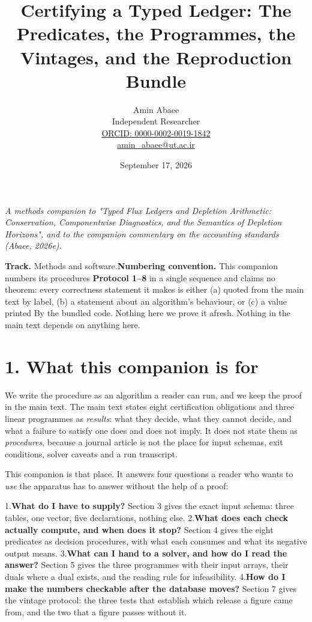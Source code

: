 \documentclass[11pt]{article}
\begin{document}
\title{Certifying a Typed Ledger: The Predicates, the Programmes, the Vintages, and the Reproduction Bundle}
\author{Amin Abaee\\[0.35em]
{\small Independent Researcher}\\[0.55em]
{\small\href{https://orcid.org/\allowbreak{}0000-0002-0019-1842}{ORCID: 0000-0002-0019-1842}}\\[0.3em]
{\small\href{mailto:amin\_abaee@ut.ac.ir}{amin\_abaee@ut.ac.ir}}}
\date{September 17, 2026}
\maketitle

\emph{A methods companion to "Typed Flux Ledgers and Depletion Arithmetic: Conservation, Componentwise Diagnostics, and the Semantics of Depletion Horizons", and to the companion commentary on the accounting standards (Abaee, 2026e).}

\textbf{Track.} Methods and software.\textbf{Numbering convention.} This companion numbers its procedures \textbf{Protocol 1--8} in a single sequence and claims no theorem: every correctness statement it makes is either (a) quoted from the main text by label, (b) a statement about an algorithm's behaviour, or (c) a value printed By the bundled code. Nothing here we prove it afresh. Nothing in the main text depends on anything here.

\vspace{0.8em}

\section*{1. What this companion is for}\label{1-what-this-companion-is-for}

We write the procedure as an algorithm a reader can run, and we keep the proof in the main text. The main text states eight certification obligations and three linear programmes as \emph{results}: what they decide, what they cannot decide, and what a failure to satisfy one does and does not imply. It does not state them as \emph{procedures}, because a journal article is not the place for input schemas, exit conditions, solver caveats and a run transcript.

This companion is that place. It answers four questions a reader who wants to \emph{use} the apparatus has to answer without the help of a proof:

1.\textbf{What do I have to supply?} Section 3 gives the exact input schema: three tables, one vector, five declarations, nothing else. 2.\textbf{What does each check actually compute, and when does it stop?} Section 4 gives the eight predicates as decision procedures, with what each consumes and what its negative output means. 3.\textbf{What can I hand to a solver, and how do I read the answer?} Section 5 gives the three programmes with their input arrays, their duals where a dual exists, and the reading rule for infeasibility. 4.\textbf{How do I make the numbers checkable after the database moves?} Section 7 gives the vintage protocol: the three tests that establish which release a figure came from, and the two that a figure passes without it.
\end{document}

